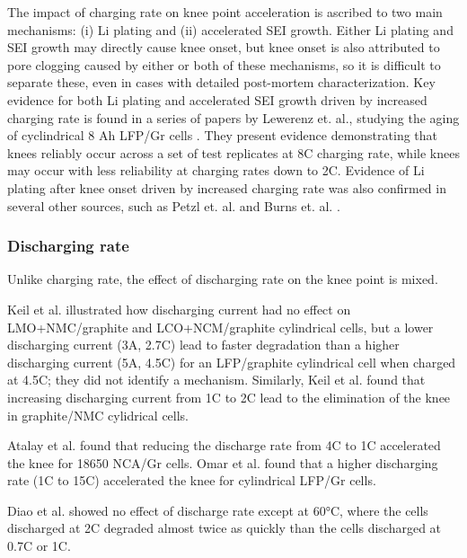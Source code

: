 \documentclass{article}
\begin{document}
The impact of charging rate on knee point acceleration is ascribed to two main mechanisms: (i) Li plating and (ii) accelerated SEI growth. Either Li plating and SEI growth may directly cause knee onset, but knee onset is also attributed to pore clogging caused by either or both of these mechanisms, so it is difficult to separate these, even in cases with detailed post-mortem characterization. Key evidence for both Li plating and accelerated SEI growth driven by increased charging rate is found in a series of papers by Lewerenz et. al., studying the aging of cyclindrical 8 Ah LFP/Gr cells \cite{lewerenz_systematic_2017,lewerenz_post-mortem_2017}. They present evidence demonstrating that knees reliably occur across a set of test replicates at 8C charging rate, while knees may occur with less reliability at charging rates down to 2C.  Evidence of Li plating after knee onset driven by increased charging rate was also confirmed in several other sources, such as Petzl et. al. \cite{petzl_lithium_2015} and Burns et. al. \cite{burns_-situ_2015}. 



\subsubsection{Discharging rate}

Unlike charging rate, the effect of discharging rate on the knee point is mixed.

Keil et al.\cite{keil_charging_2016} illustrated how discharging current had no effect on LMO+NMC/graphite and LCO+NCM/graphite cylindrical cells, but a lower discharging current (3A, 2.7C) lead to faster degradation than a higher discharging current (5A, 4.5C) for an LFP/graphite cylindrical cell when charged at 4.5C; they did not identify a mechanism. 
Similarly, Keil et al.\cite{keil_linear_2019} found that increasing discharging current from 1C to 2C lead to the elimination of the knee in graphite/NMC cylidrical cells.

Atalay et al.\cite{atalay_theory_2020} found that reducing the discharge rate from 4C to 1C accelerated the knee for 18650 NCA/Gr cells.
Omar et al. \cite{omar_lithium_2014} found that a higher discharging rate (1C to 15C) accelerated the knee for cylindrical LFP/Gr cells.

Diao et al.\cite{diao_accelerated_2019} showed no effect of discharge rate except at 60°C, where the cells discharged at 2C degraded almost twice as quickly than the cells discharged at 0.7C or 1C. 
\end{document}
